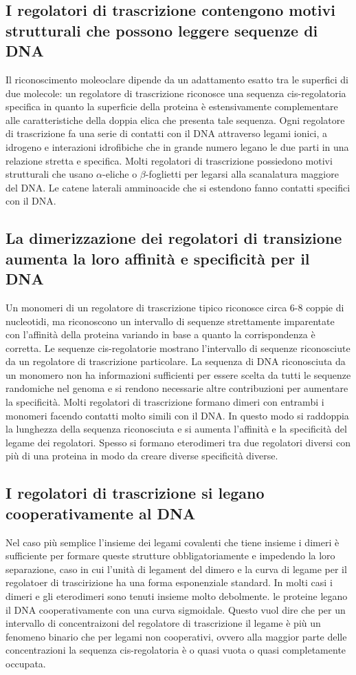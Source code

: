 \subsection{I regolatori di trascrizione contengono motivi strutturali che possono leggere sequenze di DNA}
Il riconoscimento moleoclare dipende da un adattamento esatto tra le superfici di due molecole: un regolatore di trascrizione riconosce una sequenza cis-regolatoria specifica in quanto 
la superficie della proteina \`e estensivamente complementare alle caratteristiche della doppia elica che presenta tale sequenza. Ogni regolatore di trascrizione fa una serie di contatti
con il DNA attraverso legami ionici, a idrogeno e interazioni idrofibiche che in grande numero legano le due parti in una relazione stretta e specifica. Molti regolatori di trascrizione
possiedono motivi strutturali che usano $\alpha$-eliche o $\beta$-foglietti per legarsi alla scanalatura maggiore del DNA. Le catene laterali amminoacide che si estendono fanno contatti
specifici con il DNA.
\subsection{La dimerizzazione dei regolatori di transizione aumenta la loro affinit\`a e specificit\`a per il DNA}
Un monomeri di un regolatore di trascrizione tipico riconosce circa $6$-$8$ coppie di nucleotidi, ma riconoscono un intervallo di sequenze strettamente imparentate con l'affinit\`a della
proteina variando in base a quanto la corrispondenza \`e corretta. Le sequenze cis-regolatorie mostrano l'intervallo di sequenze riconosciute da un regolatore di trascrizione 
particolare. La sequenza di DNA riconosciuta da un monomero non ha informazioni sufficienti per essere scelta da tutti le sequenze randomiche nel genoma e si rendono necessarie altre
contribuzioni per aumentare la specificit\`a. Molti regolatori di trascrizione formano dimeri con entrambi i monomeri facendo contatti molto simili con il DNA. In questo modo si 
raddoppia la lunghezza della sequenza riconosciuta e si aumenta l'affinit\`a e la specificit\`a del legame dei regolatori. Spesso si formano eterodimeri tra due regolatori diversi con 
pi\`u di una proteina in modo da creare diverse specificit\`a diverse.
\subsection{I regolatori di trascrizione si legano cooperativamente al DNA}
Nel caso pi\`u semplice l'insieme dei legami covalenti che tiene insieme i dimeri \`e sufficiente per formare queste strutture obbligatoriamente e impedendo la loro separazione, caso in
cui l'unit\`a di legament del dimero e la curva di legame per il regolatoer di trascirizione ha una forma esponenziale standard. In molti casi i dimeri e gli eterodimeri sono tenuti
insieme molto debolmente. le proteine legano il DNA cooperativamente con una curva sigmoidale. Questo vuol dire che per un intervallo di concentraizoni del regolatore di trascrizione
il legame \`e pi\`u un fenomeno binario che per legami non cooperativi, ovvero alla maggior parte delle concentrazioni la sequenza cis-regolatoria \`e o quasi vuota o quasi completamente
occupata.
